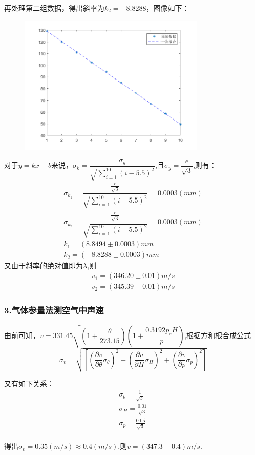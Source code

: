 \documentclass[12pt,a4paper,UTF8]{ctexart}
\begin{document}
	再处理第二组数据，得出斜率为$k_2=-8.8288$，图像如下：
	\begin{figure}[htbp]
		\centering
		\includegraphics[width=3.5in]{xiang2.png}
		\end{figure}
		\par
	对于$y=kx+b$来说，$\sigma_k=\dfrac{\sigma_y}{\sqrt{\sum_{i=1}^{10}(i-5.5)^2}}$,且$\sigma_y=\dfrac{e}{\sqrt{3}}$,则有：
	\begin{gather*}
	\sigma_{k_1}=\dfrac{\frac{e}{\sqrt{3}}}{\sqrt{\sum_{i=1}^{10}(i-5.5)^2}}=0.0003(mm) \\
	\sigma_{k_2}=\dfrac{\frac{e}{\sqrt{3}}}{\sqrt{\sum_{i=1}^{10}(i-5.5)^2}}=0.0003(mm) \\
	k_1=(8.8494\pm0.0003)mm \\
	k_2=(-8.8288\pm0.0003)mm
	\end{gather*}
	又由于斜率的绝对值即为$\lambda$,则
	\begin{gather*}
	v_1=(346.20\pm0.01)m/s \\
	v_2=(345.39\pm0.01)m/s
	\end{gather*}
	
	\subsubsection*{3.气体参量法测空气中声速}
	由前可知，$v=331.45 \sqrt{(1+\dfrac{\theta}{273.15})(1+\dfrac{0.3192p_{s}H}{p})}$,根据方和根合成公式
	\begin{equation*}
	\sigma_v=\sqrt{[(\frac{\partial v}{\partial \theta}\sigma_{\theta})^2+(\frac{\partial v}{\partial H} \sigma_{H})^2+(\frac{\partial v}{\partial p} \sigma_{p})^2]}
	\end{equation*}
	\par
	又有如下关系：
	\begin{gather*}
	\sigma_{\theta}=\frac{1}{\sqrt{3}} \\
	\sigma_H =\frac{0.01}{\sqrt{3}} \\
	\sigma_p=\frac{0.05}{\sqrt{3}}
	\end{gather*}
	\\
	得出$\sigma_v=0.35(m/s)\approx 0.4(m/s)$,则$v=(347.3\pm0.4)m/s$.
	
\end{document}
